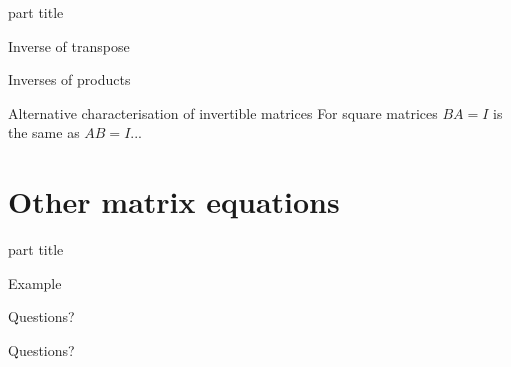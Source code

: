 \documentclass{beamer}
\begin{document}
\begin{frame}
  \begin{beamercolorbox}[sep=12pt,center]{part title}
    \insertsection\par
  \end{beamercolorbox}
\end{frame}

\begin{frame}{Inverse of transpose}
  
\end{frame}

\begin{frame}{Inverses of products}
  
\end{frame}

\begin{frame}{Alternative characterisation of invertible matrices}
  For square matrices $BA=I$ is the same as $AB=I$...
\end{frame}

\section{Other matrix equations}

\begin{frame}
  \begin{beamercolorbox}[sep=12pt,center]{part title}
    \insertsection\par
  \end{beamercolorbox}
\end{frame}

\begin{frame}{Example}
  
\end{frame}

\begin{frame}
  Questions?
\end{frame}

\begin{frame}
  Questions?
\end{frame}
\end{document}
